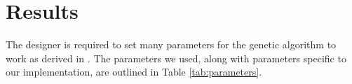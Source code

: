 \documentclass[letterpaper, 10 pt, conference]{ieeeconf}  %
\begin{document}
%

\section{Results}\label{results}
The designer is required to set many parameters for the genetic algorithm to work as derived in \cite{Parkinson2019}. The parameters we used, along with parameters specific to our implementation, are outlined in Table \ref{tab:parameters}.
\end{document}
